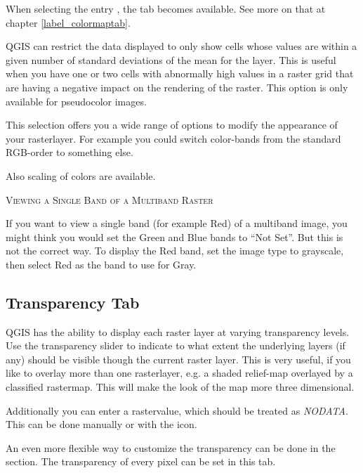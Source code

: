 When selecting the entry , the tab
 becomes available. See more on that at chapter
\ref{label_colormaptab}.

QGIS can restrict the data displayed to only show cells whose values are
within a given number of standard deviations of the mean for the
layer. This is useful when you have one or
two cells with abnormally high values in a raster grid that are having a
negative impact on the rendering of the raster. This option is only available
for pseudocolor images.


This selection offers you a wide range of options to modify the appearance
of your rasterlayer. For example you could switch color-bands from the
standard RGB-order to something else.

Also scaling of colors are available.


\begin{Tip}\caption{\textsc{Viewing a Single Band of a Multiband Raster}}
If you want to view a single band (for example Red) of a multiband
image, you might think you would set the Green and Blue bands to ``Not
Set''. But this is not the correct way. To display the Red band,
set the image type to grayscale, then select Red as the band to use for Gray.
\end{Tip}

\subsection{Transparency Tab} \label{rastertab:transparency}

QGIS has the ability to display each raster layer at varying transparency
levels. Use the transparency slider to indicate to
what extent the underlying layers (if any) should be visible though the
current raster layer.
This is very useful, if
you like to overlay more than one rasterlayer, e.g. a shaded relief-map
overlayed by a classified rastermap. This will make the look of the map
more three dimensional.

Additionally you can enter a rastervalue, which should be treated as
{\em NODATA}. This can be done manually or with the 
 icon.

An even more flexible way to customize the transparency can be done in the
 section.
The transparency of every pixel can be set in this tab.

